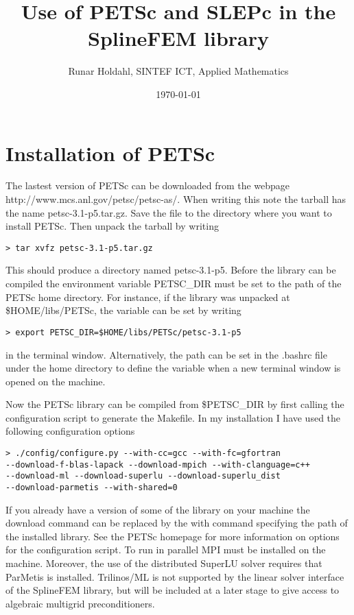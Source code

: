 \documentclass[a4wide,11pt]{article}
\title{Use of PETSc and SLEPc in the SplineFEM library}
\author{Runar Holdahl, SINTEF ICT, Applied Mathematics}
\date{\today}
\begin{document}
\maketitle

\section{Installation of PETSc}
The lastest version of PETSc can be downloaded from the webpage
\textsf{http://www.mcs.anl.gov/petsc/petsc-as/}. When writing 
this note the tarball has the name \textsf{petsc-3.1-p5.tar.gz}.
Save the file to the directory where you want to install PETSc.
Then unpack the tarball by writing
\begin{verbatim}
> tar xvfz petsc-3.1-p5.tar.gz
\end{verbatim}
This should produce a directory named \textsf{petsc-3.1-p5}. Before 
the library can be compiled the environment variable \textsf{PETSC\_DIR}
must be set to the path of the PETSc home directory. For instance, if the
library was unpacked at \$HOME/libs/PETSc, the variable can be set by
writing
\begin{verbatim}
> export PETSC_DIR=$HOME/libs/PETSc/petsc-3.1-p5
\end{verbatim}
in the terminal window. Alternatively, the path can be set in the 
\textsf{.bashrc} file under the home directory to define the variable 
when a new terminal window is opened on the machine.

Now the PETSc library can be compiled from \textsf{\$PETSC\_DIR} by 
first calling the configuration script to generate the \textsf{Makefile}.
In my installation I have used the following configuration options
\begin{verbatim}
> ./config/configure.py --with-cc=gcc --with-fc=gfortran 
--download-f-blas-lapack --download-mpich --with-clanguage=c++ 
--download-ml --download-superlu --download-superlu_dist 
--download-parmetis --with-shared=0
\end{verbatim}
If you already have a version of some of the library on your machine
the \textsf{download} command can be replaced by the \textsf{with}
command specifying the path of the installed library. See the PETSc
homepage for more information on options for the configuration script.
To run in parallel MPI must be installed on the machine. Moreover, the
use of the distributed SuperLU solver requires that ParMetis is installed.
Trilinos/ML is not supported by the linear solver interface of the
SplineFEM library, but will be included at a later stage to give access
to algebraic multigrid preconditioners.
\end{document}

